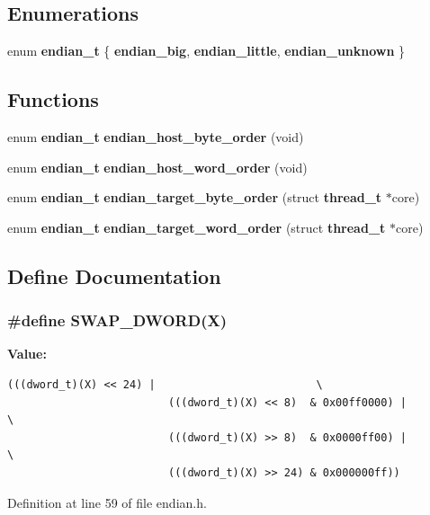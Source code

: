 \subsection*{Enumerations}
\begin{CompactItemize}
\item 
enum {\bf endian\_\-t} \{ {\bf endian\_\-big}, 
{\bf endian\_\-little}, 
{\bf endian\_\-unknown}
 \}
\end{CompactItemize}
\subsection*{Functions}
\begin{CompactItemize}
\item 
enum {\bf endian\_\-t} {\bf endian\_\-host\_\-byte\_\-order} (void)
\item 
enum {\bf endian\_\-t} {\bf endian\_\-host\_\-word\_\-order} (void)
\item 
enum {\bf endian\_\-t} {\bf endian\_\-target\_\-byte\_\-order} (struct {\bf thread\_\-t} $\ast$core)
\item 
enum {\bf endian\_\-t} {\bf endian\_\-target\_\-word\_\-order} (struct {\bf thread\_\-t} $\ast$core)
\end{CompactItemize}


\subsection{Define Documentation}
\subsubsection[{SWAP\_\-DWORD}]{\setlength{\rightskip}{0pt plus 5cm}\#define SWAP\_\-DWORD(X)}\label{endian_8h_2cfef8868cc6623612205249eee3fab5}


\textbf{Value:}

\begin{Code}\begin{verbatim}(((dword_t)(X) << 24) |                         \
                         (((dword_t)(X) << 8)  & 0x00ff0000) |          \
                         (((dword_t)(X) >> 8)  & 0x0000ff00) |          \
                         (((dword_t)(X) >> 24) & 0x000000ff))
\end{verbatim}
\end{Code}


Definition at line 59 of file endian.h.
